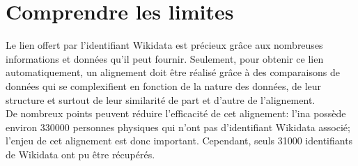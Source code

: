 \section{\label{II-C-4}Comprendre les limites}

Le lien offert par l'identifiant Wikidata est précieux grâce aux nombreuses informations et données qu'il peut fournir. Seulement,  pour obtenir ce lien automatiquement, un alignement doit être réalisé grâce à des comparaisons de données qui se complexifient en fonction de la nature des données, de leur structure et surtout de leur similarité de part et d'autre de l'alignement.\\

De nombreux points peuvent réduire l'efficacité de cet alignement: l'\ac{ina} possède environ 330000 personnes physiques qui n'ont pas d'identifiant Wikidata associé; l'enjeu de cet alignement est donc important. Cependant, seuls 31000 identifiants de Wikidata ont pu être récupérés.

